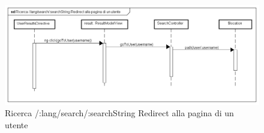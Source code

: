 \label{Ricerca /:lang/search/:searchString Redirect alla pagina di un utente}

\begin{figure}[ht]
	\centering
	\includegraphics[scale=0.5,keepaspectratio]{UML/DiagrammiDiSequenza/Front-End/Search_goToUser.png}
	\caption{Ricerca /:lang/search/:searchString Redirect alla pagina di un utente}
\end{figure} \FloatBarrier